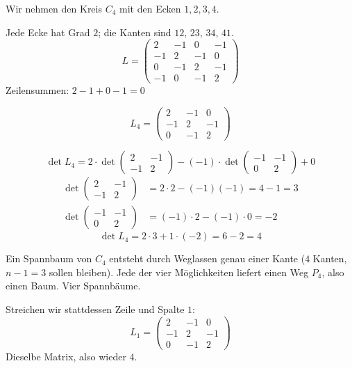 \begin{merksatz}
Wir nehmen den Kreis $C_4$ mit den Ecken $1,2,3,4$.

Jede Ecke hat Grad $2$; die Kanten sind $12$, $23$, $34$, $41$.
\[ L = \begin{pmatrix}
2 & -1 & 0 & -1\\
-1 & 2 & -1 & 0\\
0 & -1 & 2 & -1\\
-1 & 0 & -1 & 2
\end{pmatrix} \]
Zeilensummen: $2-1+0-1 = 0$ \checkmark

\[ L_4 = \begin{pmatrix} 2 & -1 & 0\\ -1 & 2 & -1\\ 0 & -1 & 2 \end{pmatrix} \]

\[ \det L_4 = 2 \cdot \det\!\begin{pmatrix} 2 & -1\\ -1 & 2\end{pmatrix} - (-1)\cdot \det\!\begin{pmatrix} -1 & -1\\ 0 & 2\end{pmatrix} + 0 \]
\begin{align*}
\det\!\begin{pmatrix} 2 & -1\\ -1 & 2\end{pmatrix} &= 2\cdot 2 - (-1)(-1) = 4 - 1 = 3\\
\det\!\begin{pmatrix} -1 & -1\\ 0 & 2\end{pmatrix} &= (-1)\cdot 2 - (-1)\cdot 0 = -2
\end{align*}
\[ \det L_4 = 2 \cdot 3 + 1 \cdot (-2) = 6 - 2 = 4 \]

Ein Spannbaum von $C_4$ entsteht durch Weglassen genau einer Kante ($4$ Kanten, $n-1 = 3$ sollen bleiben). Jede der vier Möglichkeiten liefert einen Weg $P_4$, also einen Baum. Vier Spannbäume. \checkmark

Streichen wir stattdessen Zeile und Spalte $1$:
\[ L_1 = \begin{pmatrix} 2 & -1 & 0\\ -1 & 2 & -1\\ 0 & -1 & 2\end{pmatrix} \]
Dieselbe Matrix, also wieder $4$. \checkmark
\end{merksatz}

